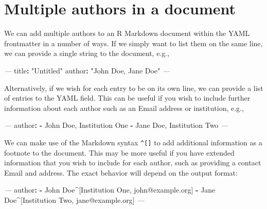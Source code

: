 \documentclass[
  11pt,
]{krantz}
\newenvironment{Shaded}{\begin{snugshade}}{\end{snugshade}}
\newcommand{\AttributeTok}[1]{\textcolor[rgb]{0.61,0.61,0.61}{#1}}
\newcommand{\FunctionTok}[1]{\textcolor[rgb]{0,0,0}{#1}}
\newcommand{\KeywordTok}[1]{\textcolor[rgb]{0.27,0.27,0.27}{\textbf{#1}}}
\newcommand{\PreprocessorTok}[1]{\textcolor[rgb]{0.37,0.37,0.37}{\textit{#1}}}
\newcommand{\StringTok}[1]{\textcolor[rgb]{0.5,0.5,0.5}{#1}}
\begin{document}
\hypertarget{multiple-authors}{%
\section{Multiple authors in a document}\label{multiple-authors}}

We can add multiple authors to an R Markdown document within the YAML frontmatter in a number of ways. If we simply want to list them on the same line, we can provide a single string to the document, e.g.,

\begin{Shaded}
\begin{Highlighting}[]
\PreprocessorTok{---}
\FunctionTok{title}\KeywordTok{:}\AttributeTok{ }\StringTok{"Untitled"}
\FunctionTok{author}\KeywordTok{:}\AttributeTok{ }\StringTok{"John Doe, Jane Doe"}
\PreprocessorTok{---}
\end{Highlighting}
\end{Shaded}

Alternatively, if we wish for each entry to be on its own line, we can provide a list of entries to the YAML field. This can be useful if you wish to include further information about each author such as an Email address or institution, e.g.,

\begin{Shaded}
\begin{Highlighting}[]
\PreprocessorTok{---}
\FunctionTok{author}\KeywordTok{:}
\AttributeTok{  }\KeywordTok{-}\AttributeTok{ John Doe, Institution One}
\AttributeTok{  }\KeywordTok{-}\AttributeTok{ Jane Doe, Institution Two}
\PreprocessorTok{---}
\end{Highlighting}
\end{Shaded}

We can make use of the Markdown syntax \texttt{\^{}{[}{]}} to add additional information as a footnote to the document. This may be more useful if you have extended information that you wish to include for each author, such as providing a contact Email and address. The exact behavior will depend on the output format:

\begin{Shaded}
\begin{Highlighting}[]
\PreprocessorTok{---}
\FunctionTok{author}\KeywordTok{:}
\AttributeTok{  }\KeywordTok{-}\AttributeTok{ John Doe^[Institution One, john@example.org]}
\AttributeTok{  }\KeywordTok{-}\AttributeTok{ Jane Doe^[Institution Two, jane@example.org]}
\PreprocessorTok{---}
\end{Highlighting}
\end{Shaded}
\end{document}
